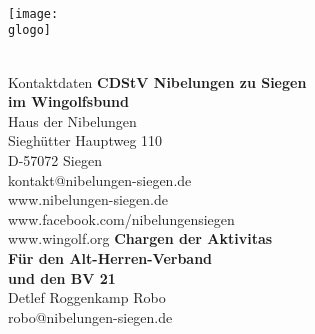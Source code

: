 \newcommand \gvierteSeiteTitel {Kontaktdaten}


\newcommand \gAmt[5]{
	#1 #2 #3 \vulgo #4\\
}

\newcommand \gvierteSeite {
	\textbf{CDStV Nibelungen zu Siegen\\im Wingolfsbund}\\
	Haus der Nibelungen\\
	Sieghütter Hauptweg 110\\
	D-57072 Siegen \\
	kontakt@nibelungen-siegen.de\\
	www.nibelungen-siegen.de\\
	www.facebook.com/nibelungensiegen\\
	www.wingolf.org
	\vfill
	\textbf{Chargen der Aktivitas}\\
	\setlength\parindent{24pt}
	\gAmtX
	\gAmtXX
	\gAmtXXX
	\gAmtFM
	\setlength\parindent{0pt}
	\vfill
	\textbf{Für den Alt-Herren-Verband\\und den BV 21}\\
	Detlef Roggenkamp \vulgo Robo\\
	robo@nibelungen-siegen.de
} 




\newcommand \lersteSeite {
		
		\gorga \\
		{\fontsize {\gsgL}{\dls} \selectfont \gorgb} \\
		\gorgc \\	
		\texttt{[image: \\glogo]}
		{\fontsize {\gsgL}{\dls} \selectfont \gsempro} \\
		\gsem \\
}

\neueSeite
	{\ohneKopzeile}
	{\zentriert}
	{\ohneTitel}
	{\lersteSeite}	


\neueSeite
	{\mitKopfzeile}
	{\linksbuending}
	{\gzweiteSeiteTitel}
	{\gzweiteSeite}
	

\neueSeite
	{\mitKopfzeile}
	{\linksbuending}
	{\gdritteSeiteTitel}
	{\gdritteSeite}
	

\neueSeite
	{\mitKopfzeile}
	{\linksbuending}
	{\gvierteSeiteTitel}
	{\gvierteSeite}
